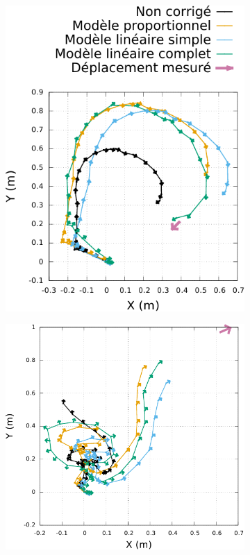 \begin{figure}[htb]
\begin{subfigure}{0.28\paperwidth}
        \includegraphics[type=pdf,ext=.pdf,read=.pdf,width=1.0\linewidth]{../plot/OdometryCMAES/ordersTraj3}
    \end{subfigure}
    \newline
    \begin{subfigure}{0.28\paperwidth}
        \centering
        \includegraphics[type=pdf,ext=.pdf,read=.pdf,width=1.0\linewidth]{../plot/OdometryCMAES/ordersTraj4}

\end{subfigure}
\end{figure}
